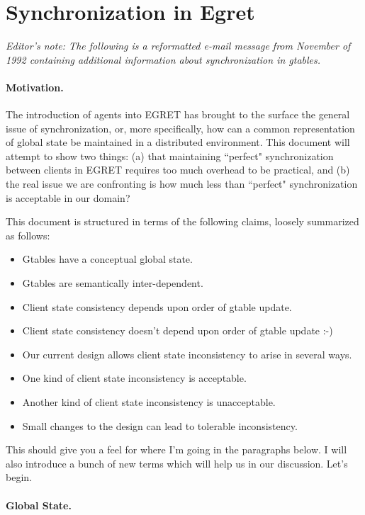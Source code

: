 \newpage
\section{Synchronization in Egret}
\label{app:synchronization}

{\em Editor's note: The following is a reformatted e-mail message from 
November of 1992 containing additional information about synchronization
in gtables.}


\paragraph{Motivation.}

The introduction of agents into EGRET has brought to the surface the
general issue of synchronization, or, more specifically, how can a
common representation of global state be maintained in a distributed
environment. This document will attempt to show two things: (a) that
maintaining ``perfect" synchronization between clients in EGRET
requires too much overhead to be practical, and (b) the real issue
we are confronting is how much less than ``perfect" synchronization 
is acceptable in our domain?

This document is structured in terms of the following claims, 
loosely summarized as follows:

\begin{itemize}
\item  Gtables have a conceptual global state.
\item  Gtables are semantically inter-dependent.
\item  Client state consistency depends upon order of gtable update.
\item  Client state consistency doesn't depend upon order of gtable update :-)
\item  Our current design allows client state inconsistency to arise in 
    several ways. 
\item  One kind of client state inconsistency is acceptable.
\item  Another kind of client state inconsistency is unacceptable.
\item  Small changes to the design can lead to tolerable inconsistency.
\end{itemize}

This should give you a feel for where I'm going in the paragraphs
below.  I will also introduce a bunch of new terms which will help us
in our discussion.  Let's begin.

\paragraph{Global State.}

